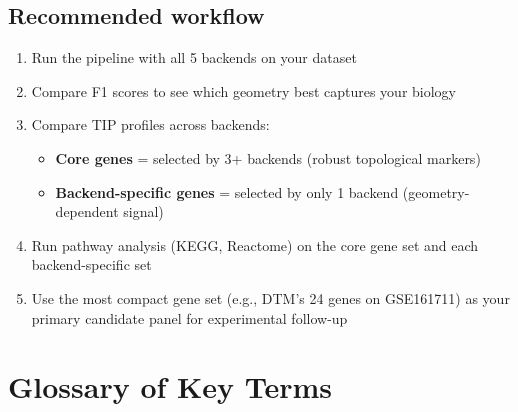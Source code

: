 \documentclass[11pt]{article}
\begin{document}
\subsection{Recommended workflow}

\begin{enumerate}
    \item Run the pipeline with all 5 backends on your dataset
    \item Compare F1 scores to see which geometry best captures your biology
    \item Compare TIP profiles across backends:
    \begin{itemize}
        \item \textbf{Core genes} = selected by 3+ backends (robust topological markers)
        \item \textbf{Backend-specific genes} = selected by only 1 backend (geometry-dependent signal)
    \end{itemize}
    \item Run pathway analysis (KEGG, Reactome) on the core gene set and each backend-specific set
    \item Use the most compact gene set (e.g., DTM's 24 genes on GSE161711) as your primary candidate panel for experimental follow-up
\end{enumerate}

\section{Glossary of Key Terms}
\label{sec:glossary}
\end{document}
